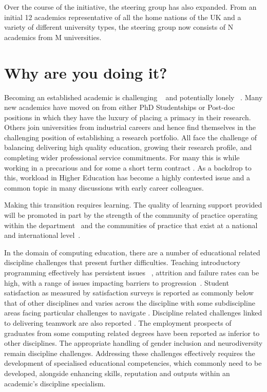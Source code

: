 \documentclass[sigconf]{acmart}
\begin{document}
Over the course of the initiative, the steering group has also expanded. From an initial 12 academics representative of all the home nations of the UK and a variety of different university types, the steering group now consists of N academics from M universities. 

\section{Why are you doing it?}
\label{sec:Why}
Becoming an established academic is challenging ~\cite{Thomas2015} and potentially lonely ~\cite{Foote2009}. Many new academics have moved on from either PhD Studentships or Post-doc positions in which they have the luxury of placing a primacy in their research. Others join universities from industrial careers and hence find themselves in the challenging position of establishing a research portfolio. All face the challenge of balancing delivering high quality education, growing their research profile, and completing wider professional service commitments. For many this is while working in a precarious and for some a short term contract \cite{UCU,JaffeS}. As a backdrop to this, workload in Higher Education has become a highly contested issue \cite{UCU2016}and a common topic in many discussions with early career colleagues.

Making this transition requires learning. The quality of learning support provided will be promoted in part by the strength of the community of practice operating within the department~\cite{Bolander2008} and the communities of practice that exist at a national and international level~\cite{Thomas2015}.

In the domain of computing education, there are a number of educational related discipline challenges that present further difficulties. Teaching introductory programming effectively has persistent issues ~\cite{davenport-et-al:latice2016,murphy-et-al:programming2017,simon-et-al:sigcse2018}, attrition and failure rates can be high, with a range of issues impacting barriers to progression~\cite{Watson:2014:FRI:2591708.2591749}. Student satisfaction as measured by satisfaction surveys is reported as commonly below that of other disciplines \cite{Sinclair2015} and varies across the discipline with some subdiscipline areas facing particular challenges to navigate \cite{Knutas2021}. Discipline related challenges linked to delivering teamwork are also reported \cite{Gordon2010,Phillips2021}. The employment prospects of graduates from some computing related degrees have been reported as inferior to other disciplines\cite{shadbolt2016shadbolt}. The appropriate handling of gender inclusion \cite{Winter2021} and neurodiversity \cite{Stuurman2109} remain discipline challenges. Addressing these challenges effectively requires the development of specialised educational competencies, which commonly need to be developed, alongside enhancing skills, reputation and outputs within an academic’s discipline specialism. 
\end{document}
